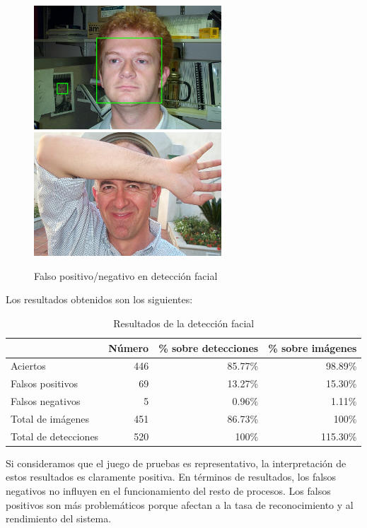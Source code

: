 \begin{figure}[!htb]
	\centering
	\includegraphics[width=7cm]{imagenes/falso_positivo.jpg}
	\includegraphics[width=7cm]{imagenes/falso_negativo.jpg}
	\caption{Falso positivo/negativo en detección facial}
	\label{fig:facial_detection_problems}
\end{figure}

Los resultados obtenidos son los siguientes:

\begin{table}
	\centering
	\begin{tabular}{|l||r|r|r|}
		\hline
		& Número & \% sobre detecciones & \% sobre imágenes \\
		\hline \hline
		Aciertos & 446 & 85.77\% & 98.89\%\\
		Falsos positivos & 69 & 13.27\% & 15.30\% \\
		Falsos negativos & 5 & 0.96\% & 1.11\% \\
		\hline
		Total de imágenes & 451 & 86.73\% & 100\% \\
		\hline
		Total de detecciones & 520 & 100\% & 115.30\%\\
		\hline
	\end{tabular}
	\caption{Resultados de la detección facial}
	\label{tab:face_detection_stats}
\end{table}

Si consideramos que el juego de pruebas es representativo, la interpretación de estos resultados es claramente positiva. En términos de resultados, los falsos negativos no influyen en el funcionamiento del resto de procesos. Los falsos positivos son más problemáticos porque afectan a la tasa de reconocimiento y al rendimiento del sistema.

